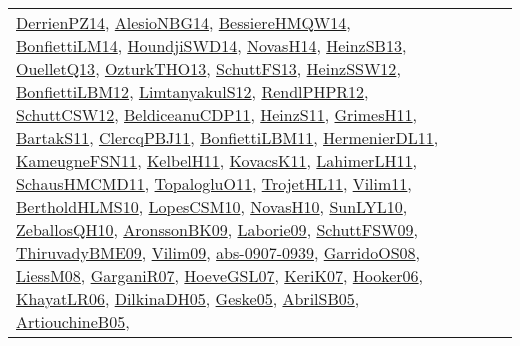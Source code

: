 {\begin{longtable}{lp{3cm}>{\raggedright}p{6cm}>{\raggedright}p{6cm}p{8cm}}
\href{papers/DerrienPZ14.pdf}{DerrienPZ14}\cite{DerrienPZ14}, \href{papers/AlesioNBG14.pdf}{AlesioNBG14}\cite{AlesioNBG14}, \href{papers/BessiereHMQW14.pdf}{BessiereHMQW14}\cite{BessiereHMQW14}, \href{papers/BonfiettiLM14.pdf}{BonfiettiLM14}\cite{BonfiettiLM14}, \href{papers/HoundjiSWD14.pdf}{HoundjiSWD14}\cite{HoundjiSWD14}, \href{articles/NovasH14.pdf}{NovasH14}\cite{NovasH14}, \href{articles/HeinzSB13.pdf}{HeinzSB13}\cite{HeinzSB13}, \href{papers/OuelletQ13.pdf}{OuelletQ13}\cite{OuelletQ13}, \href{articles/OzturkTHO13.pdf}{OzturkTHO13}\cite{OzturkTHO13}, \href{papers/SchuttFS13.pdf}{SchuttFS13}\cite{SchuttFS13}, \href{articles/HeinzSSW12.pdf}{HeinzSSW12}\cite{HeinzSSW12}, \href{papers/BonfiettiLBM12.pdf}{BonfiettiLBM12}\cite{BonfiettiLBM12}, \href{articles/LimtanyakulS12.pdf}{LimtanyakulS12}\cite{LimtanyakulS12}, \href{papers/RendlPHPR12.pdf}{RendlPHPR12}\cite{RendlPHPR12}, \href{papers/SchuttCSW12.pdf}{SchuttCSW12}\cite{SchuttCSW12}, \href{articles/BeldiceanuCDP11.pdf}{BeldiceanuCDP11}\cite{BeldiceanuCDP11}, \href{papers/HeinzS11.pdf}{HeinzS11}\cite{HeinzS11}, \href{papers/GrimesH11.pdf}{GrimesH11}\cite{GrimesH11}, \href{articles/BartakS11.pdf}{BartakS11}\cite{BartakS11}, \href{papers/ClercqPBJ11.pdf}{ClercqPBJ11}\cite{ClercqPBJ11}, \href{papers/BonfiettiLBM11.pdf}{BonfiettiLBM11}\cite{BonfiettiLBM11}, \href{papers/HermenierDL11.pdf}{HermenierDL11}\cite{HermenierDL11}, \href{papers/KameugneFSN11.pdf}{KameugneFSN11}\cite{KameugneFSN11}, \href{articles/KelbelH11.pdf}{KelbelH11}\cite{KelbelH11}, \href{articles/KovacsK11.pdf}{KovacsK11}\cite{KovacsK11}, \href{papers/LahimerLH11.pdf}{LahimerLH11}\cite{LahimerLH11}, \href{articles/SchausHMCMD11.pdf}{SchausHMCMD11}\cite{SchausHMCMD11}, \href{articles/TopalogluO11.pdf}{TopalogluO11}\cite{TopalogluO11}, \href{articles/TrojetHL11.pdf}{TrojetHL11}\cite{TrojetHL11}, \href{papers/Vilim11.pdf}{Vilim11}\cite{Vilim11}, \href{papers/BertholdHLMS10.pdf}{BertholdHLMS10}\cite{BertholdHLMS10}, \href{articles/LopesCSM10.pdf}{LopesCSM10}\cite{LopesCSM10}, \href{articles/NovasH10.pdf}{NovasH10}\cite{NovasH10}, \href{papers/SunLYL10.pdf}{SunLYL10}\cite{SunLYL10}, \href{articles/ZeballosQH10.pdf}{ZeballosQH10}\cite{ZeballosQH10}, \href{papers/AronssonBK09.pdf}{AronssonBK09}\cite{AronssonBK09}, \href{papers/Laborie09.pdf}{Laborie09}\cite{Laborie09}, \href{papers/SchuttFSW09.pdf}{SchuttFSW09}\cite{SchuttFSW09}, \href{papers/ThiruvadyBME09.pdf}{ThiruvadyBME09}\cite{ThiruvadyBME09}, \href{papers/Vilim09.pdf}{Vilim09}\cite{Vilim09}, \href{articles/abs-0907-0939.pdf}{abs-0907-0939}\cite{abs-0907-0939}, \href{articles/GarridoOS08.pdf}{GarridoOS08}\cite{GarridoOS08}, \href{articles/LiessM08.pdf}{LiessM08}\cite{LiessM08}, \href{papers/GarganiR07.pdf}{GarganiR07}\cite{GarganiR07}, \href{papers/HoeveGSL07.pdf}{HoeveGSL07}\cite{HoeveGSL07}, \href{papers/KeriK07.pdf}{KeriK07}\cite{KeriK07}, \href{articles/Hooker06.pdf}{Hooker06}\cite{Hooker06}, \href{articles/KhayatLR06.pdf}{KhayatLR06}\cite{KhayatLR06}, \href{papers/DilkinaDH05.pdf}{DilkinaDH05}\cite{DilkinaDH05}, \href{papers/Geske05.pdf}{Geske05}\cite{Geske05}, \href{papers/AbrilSB05.pdf}{AbrilSB05}\cite{AbrilSB05}, \href{papers/ArtiouchineB05.pdf}{ArtiouchineB05}\cite{ArtiouchineB05}, 
\end{longtable}}
